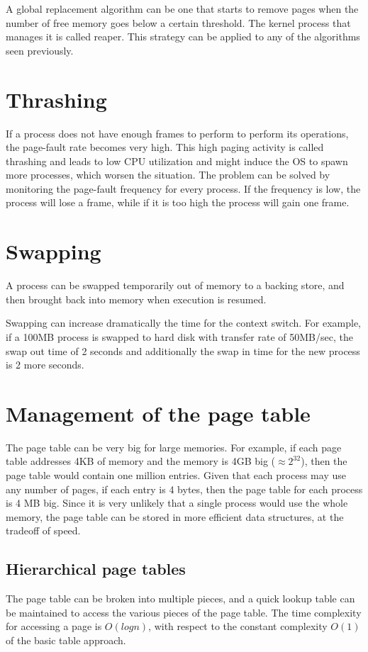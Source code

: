 A global replacement algorithm can be one that starts to remove pages when the number of free memory goes below a certain threshold. The kernel process that manages it is called reaper. This strategy can be applied to any of the algorithms seen previously.

\section{Thrashing}
If a process does not have enough frames to perform to perform its operations, the page-fault rate becomes very high. This high paging activity is called thrashing and leads to low CPU utilization and might induce the OS to spawn more processes, which worsen the situation. The problem can be solved by monitoring the page-fault frequency for every process. If the frequency is low, the process will lose a frame, while if it is too high the process will gain one frame.

\section{Swapping}
A process can be swapped temporarily out of memory to a backing store, and then brought back into memory when execution is resumed.

Swapping can increase dramatically the time for the context switch. For example, if a 100MB process is swapped to hard disk with transfer rate of 50MB/sec, the swap out time of 2 seconds and additionally the swap in time for the new process is 2 more seconds.

\section{Management of the page table}
The page table can be very big for large memories. For example, if each page table addresses 4KB of memory and the memory is 4GB big ($\approx 2^32$), then the page table would contain one million entries. Given that each process may use any number of pages, if each entry is 4 bytes, then the page table for each process is 4 MB big. Since it is very unlikely that a single process would use the whole memory, the page table can be stored in more efficient data structures, at the tradeoff of speed.

\subsection{Hierarchical page tables}
The page table can be broken into multiple pieces, and a quick lookup table can be maintained to access the various pieces of the page table. The time complexity for accessing a page is $O(logn)$, with respect to the constant complexity $O(1)$ of the basic table approach.

